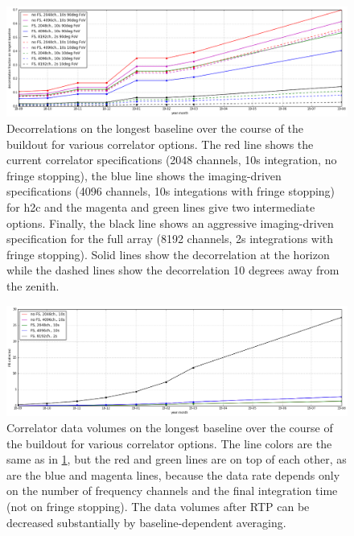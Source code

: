 \documentclass{article}
\begin{document}
\begin{figure}
\includegraphics[width=\textwidth]{spec_calcs/decorrelation.png} 
\caption{Decorrelations on the longest baseline over the course of the buildout for various correlator options. The red line shows the current 
correlator specifications (2048 channels, 10s integration, no fringe stopping), the blue line shows the imaging-driven specifications 
(4096 channels, 10s integations with fringe stopping) for h2c and the magenta and green lines give two intermediate options. 
Finally, the black line shows an aggressive imaging-driven specification for the full array (8192 channels, 2s integrations with fringe stopping). 
Solid lines show the decorrelation at the horizon while the dashed lines show the decorrelation 10 degrees away from the zenith.}
\label{Fig:decorr}
\end{figure}

\begin{figure}
\includegraphics[width=\textwidth]{spec_calcs/corr_data_vols.png} 
\caption{Correlator data volumes on the longest baseline over the course of the buildout for various correlator options. 
The line colors are the same as in \ref{Fig:decorr}, but the red and green lines are on top of each other, as are the blue and magenta lines, 
because the data rate depends only on the number of frequency channels and the final integration time (not on fringe stopping). 
The data volumes after RTP can be decreased substantially by baseline-dependent averaging.}
\label{Fig:corr_vol}
\end{figure}
\end{document}
